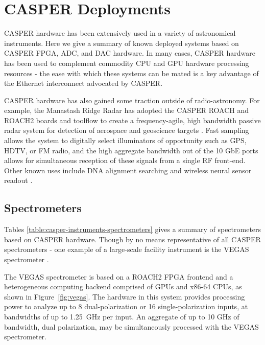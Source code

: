 \documentclass{ws-jai}
\begin{document}
\section{CASPER Deployments} \label{sec:Deployments}

CASPER hardware has been extensively used in a variety of astronomical instruments. Here we give a summary of known deployed systems based on CASPER FPGA, ADC, and DAC hardware. In many cases, CASPER hardware has been used to complement commodity CPU and GPU hardware processing resources - the ease with which these systems can be mated is a key advantage of the Ethernet interconnect advocated by CASPER.

CASPER hardware has also gained some traction outside of radio-astronomy. For example, the Manastash Ridge Radar has adopted the CASPER ROACH and ROACH2 boards and toolflow to create a frequency-agile, high bandwidth passive radar system for detection of aerospace and geoscience targets \cite{vertatschitsch_2013}.  Fast sampling allows the system to digitally select illuminators of opportunity such as GPS, HDTV, or FM radio, and the high aggregate bandwidth out of the 10 GbE ports allows for simultaneous reception of these signals from a single RF front-end. Other known uses include DNA alignment searching \citep{roach-blast} and wireless neural sensor readout \citep{implants}.

\subsection{Spectrometers}

Tables \ref{table:casper-instruments-spectrometers} gives a summary of spectrometers based on CASPER hardware. Though by no means representative of all CASPER spectrometers - one example of a large-scale facility instrument is the VEGAS spectrometer \citep{vegas}.

The VEGAS spectrometer is based on a ROACH2 FPGA frontend and a heterogeneous computing backend comprised
of GPUs and x86-64 CPUs, as shown in
Figure~\ref{fig:vegas}. The hardware in this system provides
processing power to analyze up to 8 dual-polarization or 16
single-polarization inputs, at bandwidths of up to 1.25~GHz per
input. An aggregate of up to 10 GHz of bandwidth, dual polarization,
may be simultaneously processed with the VEGAS spectrometer.
\end{document}
